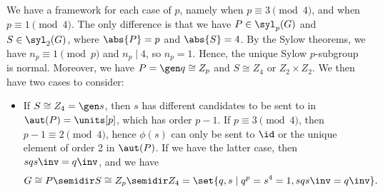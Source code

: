 \begin{sol}
    We have a framework for each case of $p$, namely  when $p \equiv 3 \pmod 4$, and  when $p \equiv 1 \pmod 4$.
	The only difference is that we have $P \in \syl_p(G)$ and $S \in \syl_2(G)$, where $\abs{P} = p$ and $\abs{S} = 4$.
	By the Sylow theorems, we have $n_p \equiv 1 \pmod p$ and $n_p \mid 4$, so $n_p = 1$.
	Hence, the unique Sylow $p$-subgroup is normal.
	Moreover, we have $P = \gen q \cong Z_p$ and $S \cong Z_4$ or $Z_2 \times Z_2$.
	We then have two cases to consider:
    \begin{itemize}
        \item If $S \cong Z_4 = \gen s$, then $s$ has different candidates to be sent to in $\aut(P) = \units[p]$, which has order $p - 1$.
	    If $p \equiv 3 \pmod 4$, then $p - 1 \equiv 2 \pmod 4$, hence $\phi(s)$ can only be sent to $\id$ or the unique element of order 2 in $\aut(P)$.
	    If we have the latter case, then $sqs\inv = q\inv$, and we have
        \[
        	G \cong P \semidir S \cong Z_p \semidir Z_4 = \set{q, s \mid q^p = s^4 = 1, sqs\inv = q\inv}.
        \]
        

\end{itemize}
\end{sol}
